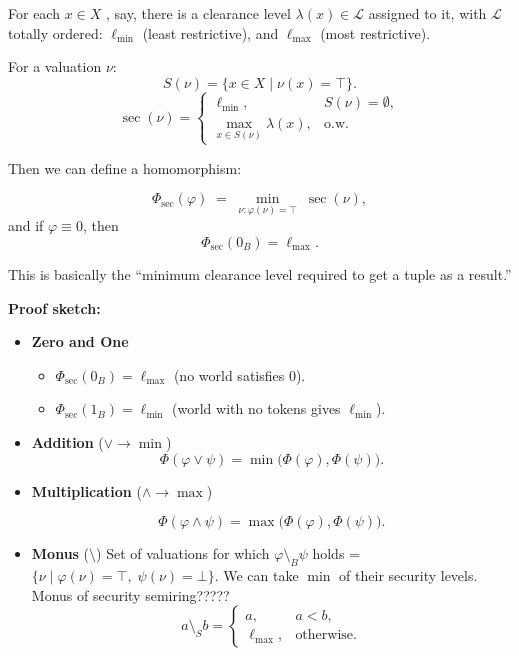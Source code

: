 For each \(x\in X\) , say, there is a clearance level \(\lambda(x)\in \mathcal L\) assigned to it,
with \(\mathcal L\) totally ordered: \(\ell_{\min}\) (least restrictive),
and \(\ell_{\max}\) (most restrictive).

For a valuation \(\nu\):
\[
S(\nu) = \{x\in X \mid \nu(x)=\top\}.
\]
\[
\sec(\nu) =
\begin{cases}
\ell_{\min}, & S(\nu)=\emptyset,\\
\max_{x\in S(\nu)} \lambda(x), & \text{o.w.}
\end{cases}
\]



Then we can define a homomorphism:

\[
\Phi_{\mathrm{sec}}(\varphi)
\;=\;
\min_{\nu:\varphi(\nu)=\top}\;\sec(\nu),
\]
and if \(\varphi\equiv 0\), then
\[
\Phi_{\mathrm{sec}}(0_B) = \ell_{\max}.
\]

This is basically the “minimum clearance level required to get a tuple as a result.”



\textbf{Proof sketch:}
\begin{itemize}
    \item \textbf{Zero and One}  
        \begin{itemize}
            \item \(\Phi_{\mathrm{sec}}(0_B)=\ell_{\max}\) (no world satisfies 0).
            \item \(\Phi_{\mathrm{sec}}(1_B)=\ell_{\min}\) (world with no tokens gives \(\ell_{\min}\)).
        \end{itemize}
    \item \textbf{Addition} (\(\vee \to \min\))  
        \[
            \Phi(\varphi\vee\psi)
            = \min\bigl(\Phi(\varphi),\Phi(\psi)\bigr).
        \]
    \item \textbf{Multiplication} (\(\wedge \to \max\))  
        
        \[
            \Phi(\varphi\wedge\psi)
            = \max\bigl(\Phi(\varphi),\Phi(\psi)\bigr).
        \]
    \item \textbf{Monus} (\(\setminus\))  
        Set of valuations for which  \(\varphi\setminus_B\psi\) holds =  
        \(\{\nu \mid \varphi(\nu)=\top,\;\psi(\nu)=\bot\}\).  
        We can take \(\min\) of their security levels.
        Monus of security semiring?????
        \[
            a\setminus_S b =
            \begin{cases}
                a, & a<b,\\
                \ell_{\max}, &\text{otherwise}.
            \end{cases}
        \]
\end{itemize}

